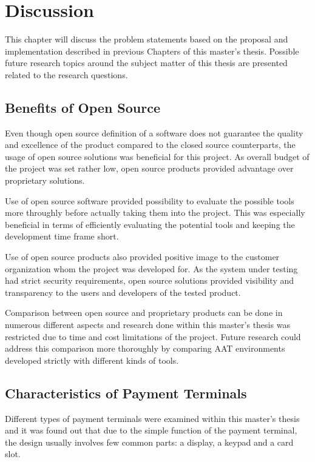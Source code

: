 
\chapter{Discussion}
\label{chapter:discussion}

This chapter will discuss the problem statements based on the proposal and implementation described in previous Chapters of this master's thesis. Possible future research topics around the subject matter of this thesis are presented related to the research questions.

\section{Benefits of Open Source}

Even though open source definition of a software does not guarantee the quality and excellence of the product compared to the closed source counterparts, the usage of open source solutions was beneficial for this project. As overall budget of the project was set rather low, open source products provided advantage over proprietary solutions.

Use of open source software provided possibility to evaluate the possible tools more throughly before actually taking them into the project. This was especially beneficial in terms of efficiently evaluating the potential tools and keeping the development time frame short. 

Use of open source products also provided positive image to the customer organization whom the project was developed for. As the system under testing had strict security requirements, open source solutions provided visibility and transparency to the users and developers of the tested product.

Comparison between open source and proprietary products can be done in numerous different aspects and research done within this master's thesis was restricted due to time and cost limitations of the project. Future research could address this comparison more thoroughly by comparing AAT environments developed strictly with different kinds of tools.

\section{Characteristics of Payment Terminals}

Different types of payment terminals were examined within this master's thesis and it was found out that due to the simple function of the payment terminal, the design usually involves few common parts: a display, a keypad and a card slot.

